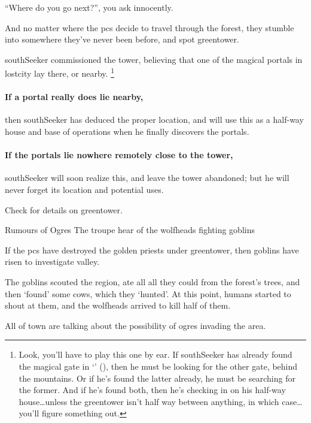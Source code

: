 ``Where do you go next?'', you ask innocently.

And no matter where the \glspl{pc} decide to travel through the forest, they stumble into somewhere they've never been before, and spot \gls{greentower}.

\Gls{southSeeker} commissioned the tower, believing that one of the magical portals in \gls{lostcity} lay there, or nearby.%
\footnote{Look, you'll have to play this one by ear.
If \gls{southSeeker} has already found the magical gate in `' (), then he must be looking for the other gate, behind the mountains.
Or if he's found the latter already, he must be searching for the former.
And if he's found both, then he's checking in on his half-way house\ldots unless the \gls{greentower} isn't half way between anything, in which case\ldots you'll figure something out.}

\paragraph{If a portal really does lie nearby,}
then \gls{southSeeker} has deduced the proper location, and will use this as a half-way house and base of operations when he finally discovers the portals.

\paragraph{If the portals lie nowhere remotely close to the tower,}
\gls{southSeeker} will soon realize this, and leave the tower abandoned; but he will never forget its location and potential uses.

Check  for details on \gls{greentower}.

{\squash Rumours of Ogres}%
{The troupe hear of the \glspl{wolfhead} fighting goblins}%

If the \glspl{pc} have destroyed the golden priests under \gls{greentower}, then goblins have risen to investigate \gls{valley}.

\begin{exampletext}
  The goblins scouted the region, ate all all they could from the forest's trees, and then `found' some cows, which they `hunted'.
  At this point, humans started to shout at them, and the \glspl{wolfhead} arrived to kill half of them.
\end{exampletext}

All of \gls{town} are talking about the possibility of ogres invading the area.


